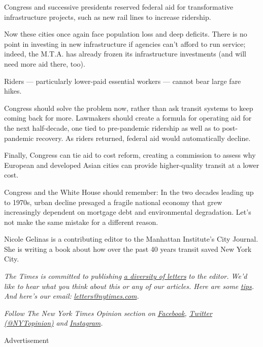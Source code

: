 Congress and successive presidents reserved federal aid for
transformative infrastructure projects, such as new rail lines to
increase ridership.

Now these cities once again face population loss and deep deficits.
There is no point in investing in new infrastructure if agencies can't
afford to run service; indeed, the M.T.A. has already frozen its
infrastructure investments (and will need more aid there, too).

Riders --- particularly lower-paid essential workers --- cannot bear
large fare hikes.

Congress should solve the problem now, rather than ask transit systems
to keep coming back for more. Lawmakers should create a formula for
operating aid for the next half-decade, one tied to pre-pandemic
ridership as well as to post-pandemic recovery. As riders returned,
federal aid would automatically decline.

Finally, Congress can tie aid to cost reform, creating a commission to
assess why European and developed Asian cities can provide
higher-quality transit at a lower cost.

Congress and the White House should remember: In the two decades leading
up to 1970s, urban decline presaged a fragile national economy that grew
increasingly dependent on mortgage debt and environmental degradation.
Let's not make the same mistake for a different reason.

Nicole Gelinas is a contributing editor to the Manhattan Institute's
City Journal. She is writing a book about how over the past 40 years
transit saved New York City.

\emph{The Times is committed to publishing}
\href{https://www.nytimes.com/2019/01/31/opinion/letters/letters-to-editor-new-york-times-women.html}{\emph{a
diversity of letters}} \emph{to the editor. We'd like to hear what you
think about this or any of our articles. Here are some}
\href{https://help.nytimes.com/hc/en-us/articles/115014925288-How-to-submit-a-letter-to-the-editor}{\emph{tips}}\emph{.
And here's our email:}
\href{mailto:letters@nytimes.com}{\emph{letters@nytimes.com}}\emph{.}

\emph{Follow The New York Times Opinion section on}
\href{https://www.facebook.com/nytopinion}{\emph{Facebook}}\emph{,}
\href{http://twitter.com/NYTOpinion}{\emph{Twitter (@NYTopinion)}}
\emph{and}
\href{https://www.instagram.com/nytopinion/}{\emph{Instagram}}\emph{.}

Advertisement


